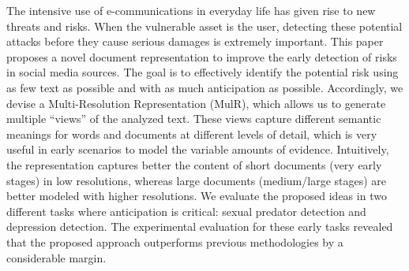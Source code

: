 The intensive use of e-communications in everyday life has given rise to new threats and risks. When the vulnerable asset is the user, detecting these potential attacks before they cause serious damages is extremely important. This paper proposes a novel document representation to improve the early detection of risks in social media sources. The goal is to effectively identify the potential risk using as few text as possible and with as much anticipation as possible. Accordingly, we devise a Multi-Resolution Representation (MulR), which allows us to generate multiple ``views'' of the analyzed text. These views capture different semantic meanings for words and documents at different levels of detail, which is very useful in early scenarios to model the variable amounts of evidence. Intuitively, the representation captures better the content of short documents (very early stages) in low resolutions, whereas large documents (medium/large stages) are better modeled with higher resolutions. We evaluate the proposed ideas in two different tasks where anticipation is critical: sexual predator detection and depression detection. The experimental evaluation for these early tasks revealed that the proposed approach outperforms previous methodologies by a considerable margin.
